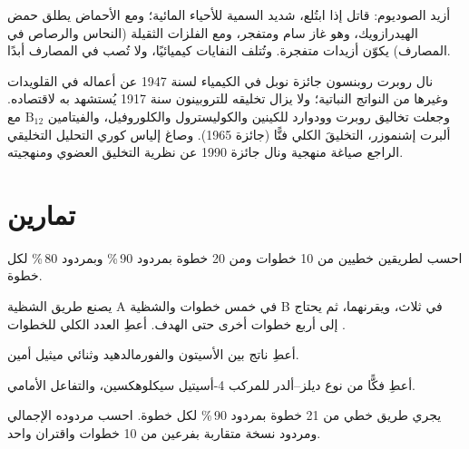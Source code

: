 \begin{safety}{}
أزيد الصوديوم: قاتل إذا ابتُلع، شديد السمية للأحياء المائية؛ ومع الأحماض
يطلق حمض الهيدرازويك، وهو غاز سام ومتفجر، ومع الفلزات الثقيلة
(النحاس والرصاص في المصارف) يكوّن أزيدات متفجرة. وتُتلف النفايات
كيميائيًا، ولا تُصب في المصارف أبدًا.
\end{safety}

\begin{history}
نال روبرت روبنسون جائزة نوبل في الكيمياء لسنة 1947 عن أعماله في
القلويدات وغيرها من النواتج النباتية؛ ولا يزال تخليقه للتروبينون سنة 1917
يُستشهد به لاقتصاده. وجعلت تخاليق روبرت وودوارد للكينين والكوليسترول 
والكلوروفيل، والفيتامين $\mathrm B_{12}$ مع ألبرت إشنموزر، التخليقَ الكلي فنًّا
(جائزة 1965). وصاغ إلياس كوري التحليل التخليقي الراجع صياغة منهجية ونال
جائزة 1990 عن نظرية التخليق العضوي ومنهجيته.
\end{history}

\section{تمارين}

\begin{exercise}[$\star$]\label{exo:b3:total-synthesis:1}
احسب  لطريقين خطيين من 10 خطوات ومن 20 خطوة بمردود 90\,\% وبمردود 80\,\% لكل
خطوة.
\end{exercise}

\begin{exercise}[$\star$]\label{exo:b3:total-synthesis:2}
يصنع طريق الشظية A في خمس خطوات والشظية B في ثلاث، ويقرنهما، ثم
يحتاج إلى أربع خطوات أخرى حتى الهدف. أعطِ العدد الكلي للخطوات 
.
\end{exercise}

\begin{exercise}[$\star$]\label{exo:b3:total-synthesis:3}
أعطِ ناتج  بين الأسيتون والفورمالدهيد 
وثنائي ميثيل أمين.
\end{exercise}

\begin{exercise}[$\star$]\label{exo:b3:total-synthesis:4}
أعطِ فكًّا من نوع ديلز--ألدر للمركب 4-أسيتيل سيكلوهكسين، والتفاعل
الأمامي.
\end{exercise}

\begin{exercise}[$\star\star$]\label{exo:b3:total-synthesis:5}
يجري طريق خطي من 21 خطوة بمردود 90\,\% لكل خطوة. احسب مردوده الإجمالي 
ومردود نسخة متقاربة بفرعين من 10 خطوات واقتران واحد.
\end{exercise}

